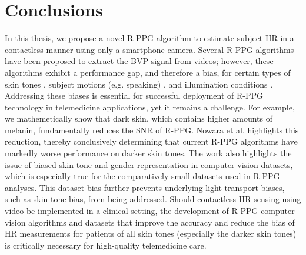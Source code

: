 %
%

\chapter{Conclusions} \label{chap:conclusion}

In this thesis, we propose a novel R-PPG algorithm to estimate subject HR in a contactless manner using only a smartphone camera. Several R-PPG algorithms have been proposed to extract the BVP signal from videos; however, these algorithms exhibit a performance gap, and therefore a bias, for certain types of skin tones \cite{nowara_meta-analysis_2020}, subject motions (e.g. speaking) \cite{mocco_motion_2016,de_haan_improved_2014,wang_exploiting_2015}, and illumination conditions \cite{li_remote_2014}. Addressing these biases is essential for successful deployment of R-PPG technology in telemedicine applications, yet it remains a challenge. For example, we mathemetically show that dark skin, which contains higher amounts of melanin, fundamentally reduces the SNR of  R-PPG. Nowara et al. \cite{nowara_meta-analysis_2020} highlights this reduction, thereby conclusively determining that current R-PPG algorithms have markedly worse performance on darker skin tones. The work also highlights the issue of biased skin tone and gender representation in computer vision datasets, which is especially true for the comparatively small datasets used in R-PPG analyses. This dataset bias further prevents underlying light-transport biases, such as skin tone bias, from being addressed. Should contactless HR sensing using video be implemented in a clinical setting, the development of R-PPG computer vision algorithms and datasets that improve the accuracy and reduce the bias of HR measurements for patients of all skin tones (especially the darker skin tones) is critically necessary for high-quality telemedicine care.

